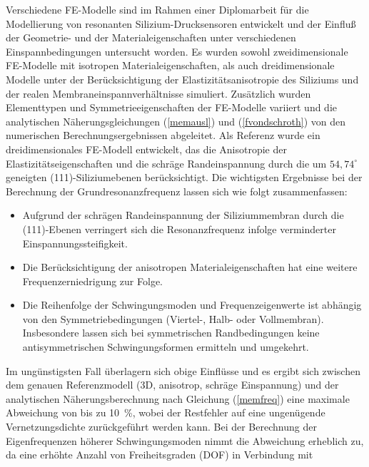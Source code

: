 Verschiedene FE-Modelle sind im Rahmen einer Diplomarbeit \cite{Sch92}
für die Modellierung von resonanten Silizium-Drucksensoren entwickelt
und der Einfluß der Geometrie- und der Materialeigenschaften unter
verschiedenen Einspannbedingungen untersucht worden. Es wurden sowohl
zweidimensionale FE-Modelle mit isotropen Materialeigenschaften, als auch
dreidimensionale Modelle unter der Berücksichtigung der
Elastizitätsanisotropie des Siliziums und der realen
Membraneinspannverhältnisse simuliert. Zusätzlich wurden Elementtypen
und Symmetrieeigenschaften der FE-Modelle variiert und die analytischen
Näherungsgleichungen (\ref{memausl}) und (\ref{fvondschroth})
von den numerischen Berechnungsergebnissen abgeleitet. Als Referenz
wurde ein dreidimensionales FE-Modell entwickelt, das die Anisotropie
der Elastizitätseigenschaften und die schräge Randeinspannung durch
die um $54,74^{\circ}$ geneigten (111)-Siliziumebenen
berücksichtigt. Die wichtigsten Ergebnisse bei der Berechnung der
Grundresonanzfrequenz lassen sich wie folgt zusammenfassen:
\begin{itemize}
\item
Aufgrund der schrägen Randeinspannung der Siliziummembran durch die
(111)-Ebenen verringert sich die Resonanzfrequenz infolge verminderter
Einspannungssteifigkeit.
\item
Die Berücksichtigung der anisotropen Materialeigenschaften hat eine
weitere Frequenzerniedrigung %
zur Folge.
\item
Die Reihenfolge der Schwingungsmoden und Frequenzeigenwerte ist abhängig
von den Symmetriebedingungen (Viertel-, Halb- oder Vollmembran).
Insbesondere lassen sich bei symmetrischen Randbedingungen keine
antisymmetrischen Schwingungsformen ermitteln und umgekehrt.
\end{itemize}
Im ungünstigsten Fall überlagern sich obige Einflüsse und es ergibt sich
zwischen dem genauen Referenzmodell (3D, anisotrop, schräge Einspannung)
und der analytischen Näherungsberechnung nach Gleichung (\ref{memfreq})
eine maximale Abweichung von bis zu 10~\%, wobei der Restfehler
auf eine ungenügende Vernetzungsdichte zurückgeführt werden kann. Bei der
Berechnung der Eigenfrequenzen höherer Schwingungsmoden
nimmt die Abweichung erheblich zu,
da eine erhöhte Anzahl von Freiheitsgraden (DOF) in Verbindung mit
